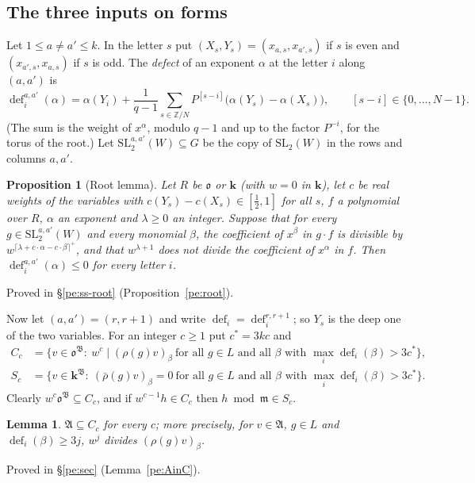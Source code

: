 \documentclass[10pt]{amsart}
\newtheorem{proposition}[theorem]{Proposition}
\newtheorem{lemma}[theorem]{Lemma}
\theoremstyle{definition}
\theoremstyle{remark}
\newcommand{\Z}{\mathbb Z}
\providecommand{\pam}{\mathfrak m}
\providecommand{\pao}{\mathfrak o}
\providecommand{\phA}{\mathfrak A}
\providecommand{\phB}{\mathfrak B}
\providecommand{\phdef}{\operatorname{def}}
\providecommand{\phk}{\boldsymbol k}
\begin{document}
\subsection{The three inputs on forms}\label{ph:ss-inputs}
Let $1\le a\ne a'\le k$. In the letter $s$ put $(X_s,Y_s)=(x_{a,s},x_{a',s})$ if $s$ is even and
$(x_{a',s},x_{a,s})$ if $s$ is odd. The \emph{defect} of an exponent $\alpha$ at the letter $i$
along $(a,a')$ is
\[
\phdef_i^{a,a'}(\alpha)=\alpha(Y_i)+\frac1{q-1}\sum_{s\in\Z/N}P^{[s-i]}\bigl(\alpha(Y_s)-\alpha(X_s)
\bigr),\qquad[s-i]\in\{0,\dots,N-1\}.
\]
(The sum is the weight of $x^\alpha$, modulo $q-1$ and up to the factor $P^{-i}$, for the torus of
the root.) Let $\mathrm{SL}_2^{a,a'}(W)\subseteq G$ be the copy of $\mathrm{SL}_2(W)$ in the rows
and columns $a,a'$.

\begin{proposition}[Root lemma]\label{ph:root}
Let $R$ be $\pao$ or $\phk$ (with $w=0$ in $\phk$), let $c$ be real weights of the variables with
$c(Y_s)-c(X_s)\in[\tfrac12,1]$ for all $s$, $f$ a polynomial over $R$, $\alpha$ an exponent and
$\lambda\ge0$ an integer. Suppose that for every $g\in\mathrm{SL}_2^{a,a'}(W)$ and every monomial
$\beta$, the coefficient of $x^\beta$ in $g\cdot f$ is divisible by $w^{\lceil\lambda+c\cdot\alpha
-c\cdot\beta\rceil^+}$, and that $w^{\lambda+1}$ does not divide the coefficient of $x^\alpha$ in
$f$. Then $\phdef_i^{a,a'}(\alpha)\le0$ for every letter $i$.
\end{proposition}
\noindent Proved in \S\ref{pe:ss-root} (Proposition~\ref{pe:root}).

Now let $(a,a')=(r,r+1)$ and write $\phdef_i=\phdef_i^{r,r+1}$; so $Y_s$ is the deep one of the two
variables. For an integer $c\ge1$ put $c^*=3kc$ and
\begin{align*}
C_c&=\bigl\{v\in\pao^\phB:\ w^c\mid(\rho(g)v)_\beta\ \text{for all }g\in L\text{ and all }\beta
\text{ with }\max_i\phdef_i(\beta)>3c^*\bigr\},\\
S_c&=\bigl\{v\in\phk^\phB:\ (\bar\rho(g)v)_\beta=0\ \text{for all }g\in L\text{ and all }\beta
\text{ with }\max_i\phdef_i(\beta)>3c^*\bigr\}.
\end{align*}
Clearly $w^c\pao^\phB\subseteq C_c$, and if $w^{c-1}h\in C_c$ then $h\bmod\pam\in S_c$.

\begin{lemma}\label{ph:AinC}
$\phA\subseteq C_c$ for every $c$; more precisely, for
$v\in\phA$, $g\in L$ and $\phdef_i(\beta)\ge3j$, $w^j$ divides $(\rho(g)v)_\beta$.
\end{lemma}
\noindent Proved in \S\ref{pe:sec} (Lemma~\ref{pe:AinC}).
\end{document}
